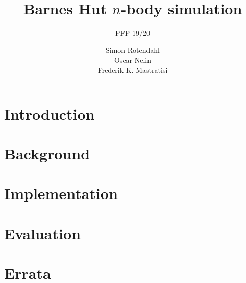 
\benchone%
\errorrate%

\title{Barnes Hut $n$-body simulation}
\subtitle{PFP 19/20}
\author[Eggmen]{Simon Rotendahl \\ Oscar Nelin \\ Frederik K. Mastratisi}
\subject{Computer Science}



\frame{\titlepage}



\section[Section]{Introduction}


\section[Section]{Background}


\section[Section]{Implementation}


\section[Section]{Evaluation}


\section[Section]{Errata}



